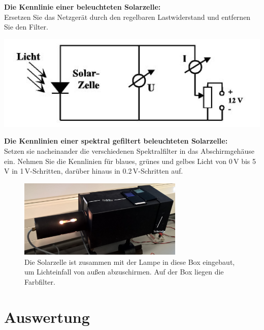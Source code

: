 \begin{enumerate}
	\begin{minipage}{0.6\textwidth}
			\item \textbf{Die Kennlinie einer beleuchteten Solarzelle:}\\
		Ersetzen Sie das Netzgerät durch den regelbaren Lastwiderstand und entfernen Sie den Filter.
	\end{minipage}
	\begin{minipage}{0.4\textwidth}
				\includegraphics[width=1.00\textwidth]{Abbildungen/solarzelle.jpg}
				\label{fig:solarzelle }
		\end{minipage}
	\item \textbf{Die Kennlinien einer spektral gefiltert beleuchteten Solarzelle:}\\
		Setzen sie nacheinander die verschiedenen Spektralfilter in das Abschirmgehäuse ein. Nehmen Sie die Kennlinien für blaues, grünes und gelbes Licht von 0\,V bis 5\,V in 1\,V-Schritten, darüber hinaus in 0.2\,V-Schritten auf.
\end{enumerate}

\begin{figure}[h]
	\centering
	\includegraphics[width=0.7\textwidth]{Abbildungen/Solarzelle_gross.jpg}
	\caption{Die Solarzelle ist zusammen mit der Lampe in diese Box eingebaut, um Lichteinfall von außen abzuschirmen. Auf der Box liegen die Farbfilter.}
\end{figure}

\section{Auswertung} 

